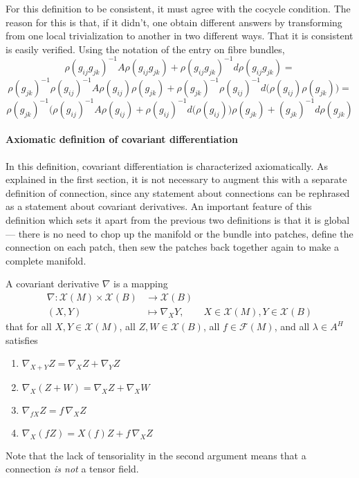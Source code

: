 \documentclass[12pt]{article}
\newcommand{\vs}{\mathcal{X}}
\newcommand{\fs}{\mathcal{F}}
\begin{document}
For this definition to be consistent, it must agree with the cocycle condition.  The reason for this is that, if it didn't, one obtain different answers by transforming from one local trivialization to another in two different ways.  That it is consistent is easily verified.  Using the notation of the entry on fibre bundles,
 $$\rho (g_{ij} g_{jk})^{-1} A \rho (g_{ij} g_{jk}) +  \rho (g_{ij} g_{jk})^{-1} d \rho (g_{ij} g_{jk}) =$$ 
 $$\rho (g_{jk})^{-1} \rho(g_{ij})^{-1} A \rho (g_{ij}) \rho(g_{jk}) +  \rho (g_{jk})^{-1} \rho(g_{ij})^{-1} d \big( \rho (g_{ij}) \rho(g_{jk}) \big) =$$
 $$\rho (g_{jk})^{-1} \big(\rho(g_{ij})^{-1} A \rho (g_{ij}) + \rho(g_{ij})^{-1} d (\rho (g_{ij}) \big) \rho(g_{jk}) + (g_{jk})^{-1} d \rho(g_{jk})$$

\paragraph{Axiomatic definition of covariant differentiation}
In this definition, covariant differentiation is characterized axiomatically.  As explained in the first section, it is not necessary to augment this with a separate definition of connection, since any statement about connections can be rephrased as a statement about covariant derivatives.  An important feature of this definition which sets it apart from the previous two definitions is that it is global --- there is no need to chop up the manifold or the bundle into patches, define the connection on each patch, then sew the patches back together again to make a complete manifold.

A covariant derivative $\nabla$ is a mapping
\begin{align*}
\nabla:\vs(M)\times\vs(B)&\rightarrow \vs(B) \\
(X,Y) &\mapsto \nabla_X Y,\qquad X \in\vs(M), Y \in\vs(B)
\end{align*}
that for all $X,Y\in \vs(M)$, all $Z,W \in \vs(B)$, all $f\in\fs(M)$, and all $\lambda \in A^H$ satisfies
\begin{enumerate}
\item $\nabla_{X+Y} Z = \nabla_X Z + \nabla_Y Z$
\item $\nabla_X (Z+W) = \nabla_X Z + \nabla_X W$
\item $\nabla_{fX} Z = f\, \nabla_X Z$
\item $\nabla_X (fZ) = X(f) Z + f\, \nabla_X Z$
\end{enumerate}
Note that the lack of tensoriality in the second argument means that a
connection {\em is not} a tensor field.  
\end{document}
